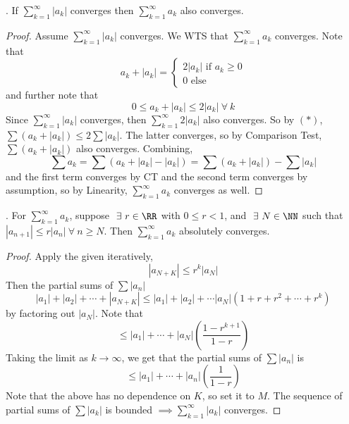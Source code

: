 \documentclass[12pt]{scrartcl}
\begin{document}
\begin{theorem}
  . If $\sum_{k=1}^\infty |a_k|$ converges then $\sum_{k=1}^\infty a_k$ also converges.

  \begin{proof}
    Assume $\sum_{k=1}^\infty |a_k|$ converges. We WTS that $\sum_{k=1}^\infty a_k$ converges. 
    Note that 
    \[a_k + |a_k| = \begin{cases}
      2|a_k| \text{ if } a_k \geq 0\\
      0 \text{ else }
    \end{cases}\]
    and further note that 
    \[0 \leq a_k + |a_k| \leq 2|a_k| \ \forall \ k\]
    Since $\sum_{k=1}^\infty |a_k|$ converges, then $\sum_{k=1}^\infty 2|a_k|$ also converges. So by 
    $(*)$, $\sum (a_k + |a_k|) \leq 2 \sum |a_k|$. The latter converges, so by 
    Comparison Test, $\sum (a_k + |a_k|)$ also converges. 
    Combining, 
    \[\sum a_k = \sum(a_k + |a_k| - |a_k|) = \sum(a_k + |a_k|) - \sum |a_k|\]
    and the first term converges by CT and the second term converges by assumption, so by Linearity, $\sum_{k=1}^\infty a_k$ 
    converges as well.
  \end{proof}
\end{theorem}

\begin{lemma}
  . For $\sum_{k=1}^\infty a_k$, suppose $\ \exists \ r \in \RR$ with $0 \leq r < 1$, 
  and $\ \exists \ N \in \NN$ such that $|a_{n+1}| \leq r|a_n| \ \forall \ n \geq N$. Then 
  $\sum_{k=1}^\infty a_k$ absolutely converges. 

  \begin{proof}
    Apply the given iteratively, 
    \[|a_{N + K}| \leq r^k|a_N|\]
    Then the partial sums of $\sum |a_n|$
    \[|a_1| + |a_2| + \cdots + |a_{N + K}| \leq |a_1| + |a_2| + \cdots |a_N|(1 + r + r^2 + \cdots + r^k)\]
    by factoring out $|a_N|$. Note that 
    \[\leq |a_1| + \cdots + |a_N| \left( \frac{1 - r^{k+1}}{1-r}\right)\]
    Taking the limit as $k\to\infty$, we get that the partial sums of $\sum |a_n|$ is 
    \[\leq |a_1| + \cdots + |a_n| \left( \frac{1}{1-r}\right)\]
    Note that the above has no dependence on $K$, so set it to $M$. The sequence of partial sums of $\sum |a_k|$ is 
    bounded $\implies \sum_{k=1}^\infty |a_k|$ converges.
  \end{proof}
\end{lemma}
\end{document}
